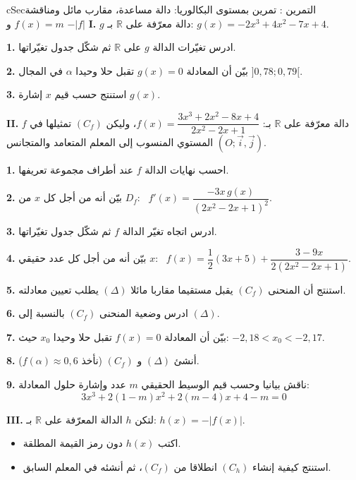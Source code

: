 \documentclass[12pt,a4paper]{article}
\newenvironment{BOX}[2]{\begin{otherlanguage}{english}\begin{arbox}{#1}{#2}}{\end{arbox}\end{otherlanguage}}
\newcounter{exo}
\newenvironment{tamrin}[1]{\stepcounter{exo}\begin{BOX}{cSec}{التمرين \theexo: #1}}{\end{BOX}}
\newcommand{\R}{\mathbb{R}}
\newcommand{\QQ}[1]{\par\smallskip\textbf{#1.} }
\begin{document}
\begin{tamrin}{تمرين بمستوى البكالوريا: دالة مساعدة، مقارب مائل ومناقشة $f(x)=m$ و $-|f|$}
\textbf{I.} $g$ دالة معرّفة على $\R$ بـ: $g(x)=-2x^{3}+4x^{2}-7x+4$.
\QQ{1} ادرس تغيّرات الدالة $g$ على $\R$ ثم شكّل جدول تغيّراتها.
\QQ{2} بيّن أن المعادلة $g(x)=0$ تقبل حلا وحيدا $\alpha$ في المجال $]0{,}78;0{,}79[$.
\QQ{3} استنتج حسب قيم $x$ إشارة $g(x)$.

\textbf{II.} $f$ دالة معرّفة على $\R$ بـ: $f(x)=\dfrac{3x^{3}+2x^{2}-8x+4}{2x^{2}-2x+1}$، وليكن $(C_f)$ تمثيلها في المستوي المنسوب إلى المعلم المتعامد والمتجانس $(O;\vec i,\vec j)$.
\QQ{1} احسب نهايات الدالة $f$ عند أطراف مجموعة تعريفها.
\QQ{2} بيّن أنه من أجل كل $x$ من $D_f$: \ $f'(x)=\dfrac{-3x\,g(x)}{(2x^{2}-2x+1)^{2}}$.
\QQ{3} ادرس اتجاه تغيّر الدالة $f$ ثم شكّل جدول تغيّراتها.
\QQ{4} بيّن أنه من أجل كل عدد حقيقي $x$: \ $f(x)=\dfrac12(3x+5)+\dfrac{3-9x}{2\left(2x^{2}-2x+1\right)}$.
\QQ{5} استنتج أن المنحنى $(C_f)$ يقبل مستقيما مقاربا مائلا $(\Delta)$ يطلب تعيين معادلته.
\QQ{6} ادرس وضعية المنحنى $(C_f)$ بالنسبة إلى $(\Delta)$.
\QQ{7} بيّن أن المعادلة $f(x)=0$ تقبل حلا وحيدا $x_0$ حيث: $-2{,}18<x_0<-2{,}17$.
\QQ{8} أنشئ $(\Delta)$ و $(C_f)$ (نأخذ $f(\alpha)\approx0{,}6$).
\QQ{9} ناقش بيانيا وحسب قيم الوسيط الحقيقي $m$ عدد وإشارة حلول المعادلة: \[3x^{3}+2(1-m)x^{2}+2(m-4)x+4-m=0\]

\textbf{III.} لتكن $h$ الدالة المعرّفة على $\R$ بـ: $h(x)=-|f(x)|$.
\begin{itemize}[label=$\spadesuit$]
\item اكتب $h(x)$ دون رمز القيمة المطلقة.
\item استنتج كيفية إنشاء $(C_h)$ انطلاقا من $(C_f)$، ثم أنشئه في المعلم السابق.
\end{itemize}
\end{tamrin}
\end{document}
